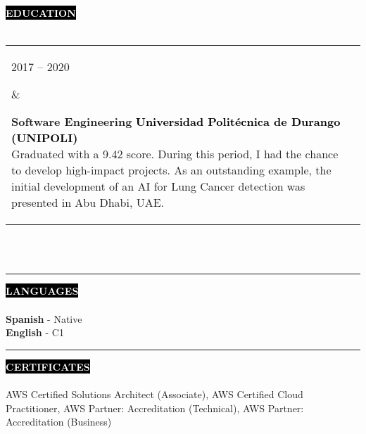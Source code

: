 \documentclass[10pt,A4]{article}
\makeatletter
\newcounter{a}
\newcounter{b}
\newcounter{c}
\newcommand{\cvsection}[1] {
	\textcolor{white}{\MakeUppercase{\textbf{#1}}}
}
\newcommand{\cvsect}[1]{
	\colorbox{black}{{\cvsection{#1}}}\\\\%
}
\newenvironment{entrylist}{%
	\begin{tabular*}{\textwidth}[t]{@{\extracolsep{\fill}}ll}
	}{%
	\end{tabular*}
}
\newcommand{\entry}[4]{%
	\parbox[t]{3.5cm}{%
		#1%
	}%
	&\parbox[t]{14cm}{%
		\textbf{#2}%
		\hfill%
		{\footnotesize \textbf{\textcolor{black}{#3}}}\\%
		#4%
	}\\\\}
\makeatother
\begin{document}

	\cvsect{Education}
	\begin{entrylist}
		\entry
		{2017 – 2020}
		{Software Engineering}
		{Universidad Politécnica de Durango (UNIPOLI)}
		{Graduated with a 9.42 score. During this period, I had the chance
        to develop high-impact projects. As an outstanding example, the initial
        development of an AI for Lung Cancer detection was presented
        in Abu Dhabi, UAE.}
	\end{entrylist}
	\\\\
	\begin{minipage}[t]{0.3\textwidth}\hrule height 0pt width 0pt%
		\cvsect{Languages}
		\textbf{Spanish} - Native\\
		\textbf{English} - C1\\
	\end{minipage}%
	\hspace{0cm}
	\begin{minipage}[t]{0.7\textwidth}\hrule height 0pt width 0pt%
		\cvsect{Certificates}
		AWS Certified Solutions Architect (Associate), AWS Certified Cloud Practitioner,
		AWS Partner: Accreditation (Technical), AWS Partner: Accreditation (Business)
	\end{minipage}%
	
\end{document}

